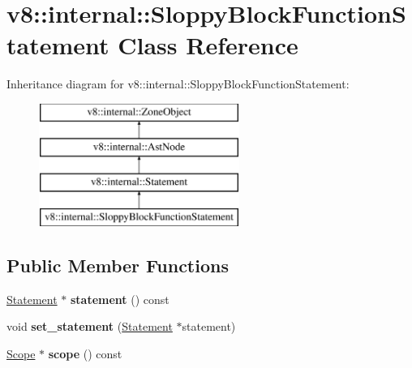 \hypertarget{classv8_1_1internal_1_1_sloppy_block_function_statement}{}\section{v8\+:\+:internal\+:\+:Sloppy\+Block\+Function\+Statement Class Reference}
\label{classv8_1_1internal_1_1_sloppy_block_function_statement}
Inheritance diagram for v8\+:\+:internal\+:\+:Sloppy\+Block\+Function\+Statement\+:\begin{figure}[H]
\begin{center}
\leavevmode
\includegraphics[height=4.000000cm]{classv8_1_1internal_1_1_sloppy_block_function_statement}
\end{center}
\end{figure}
\subsection*{Public Member Functions}
\begin{DoxyCompactItemize}
\item 
\hyperlink{classv8_1_1internal_1_1_statement}{Statement} $\ast$ {\bfseries statement} () const \hypertarget{classv8_1_1internal_1_1_sloppy_block_function_statement_a4628f21509b0ef00cd974484b64b1760}{}\label{classv8_1_1internal_1_1_sloppy_block_function_statement_a4628f21509b0ef00cd974484b64b1760}

\item 
void {\bfseries set\+\_\+statement} (\hyperlink{classv8_1_1internal_1_1_statement}{Statement} $\ast$statement)\hypertarget{classv8_1_1internal_1_1_sloppy_block_function_statement_ab4722617726a5ab849a36a4073d91ad1}{}\label{classv8_1_1internal_1_1_sloppy_block_function_statement_ab4722617726a5ab849a36a4073d91ad1}

\item 
\hyperlink{classv8_1_1internal_1_1_scope}{Scope} $\ast$ {\bfseries scope} () const \hypertarget{classv8_1_1internal_1_1_sloppy_block_function_statement_a9ba6adfa914a633491b9287cb417efe3}{}\label{classv8_1_1internal_1_1_sloppy_block_function_statement_a9ba6adfa914a633491b9287cb417efe3}

\end{DoxyCompactItemize}
